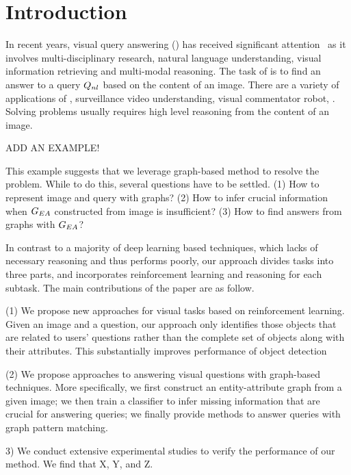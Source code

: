 \section{Introduction}
\label{sec-intro}

In recent years, visual query answering (\vqa) has received significant attention~\cite{malinowski2015ask,ren2015image,gao2015you} as it involves multi-disciplinary research, \eg natural language understanding, visual information retrieving and multi-modal reasoning. The task of \vqa is to find an answer to a query $Q_{nl}$ based on the content of an image. There are a variety of applications of \vqa, \eg surveillance video understanding, visual commentator robot, \etc. Solving \vqa problems usually requires high level reasoning from the content of an image.

\begin{example}
ADD AN EXAMPLE!
\end{example}


This example suggests that we leverage graph-based method to resolve the \vqa problem. While to do this, several questions have to be settled. (1) How to represent image and query with graphs? (2) How to infer crucial information when $G_{EA}$ constructed from image is insufficient? (3) How to find answers from graphs with $G_{EA}$? 


\vspace{2ex}
 In contrast to a majority of deep learning based \vqa techniques, which lacks of necessary reasoning and thus performs poorly, our approach divides \vqa tasks into three parts, and incorporates reinforcement learning and reasoning for each subtask. The main contributions of the paper are as follow.  

(1) We propose new approaches for visual tasks based on reinforcement learning. Given an image and a question, our approach only identifies those objects that are related to users' questions rather than the complete set of objects along with their attributes. This substantially improves performance of object detection 

(2) We propose approaches to answering visual questions with graph-based techniques. More specifically, we first construct an entity-attribute graph from a given image; we then train a classifier to infer missing information that are crucial for answering queries; %
we finally provide methods to answer queries with graph pattern matching. %

3) We conduct extensive experimental studies to verify the performance of our method. We find that X, Y, and Z. 